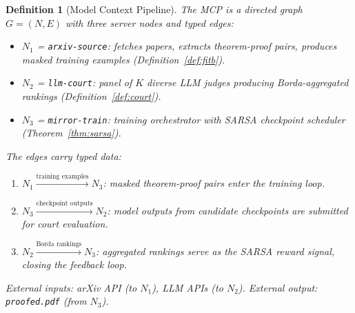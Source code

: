 \documentclass[11pt,a4paper]{article}
\newtheorem{definition}[theorem]{Definition}
\begin{document}
\begin{definition}[Model Context Pipeline]\label{def:mcp}
The MCP is a directed graph $G = (N, E)$ with three server
nodes and typed edges:
\begin{itemize}[nosep]
\item $N_1$ = \texttt{arxiv-source}: fetches papers,
  extracts theorem-proof pairs, produces masked training
  examples (Definition~\ref{def:fitb}).
\item $N_2$ = \texttt{llm-court}: panel of $K$ diverse LLM
  judges producing Borda-aggregated rankings
  (Definition~\ref{def:court}).
\item $N_3$ = \texttt{mirror-train}: training orchestrator
  with SARSA checkpoint scheduler
  (Theorem~\ref{thm:sarsa}).
\end{itemize}
The edges carry typed data:
\begin{enumerate}[label=(E\arabic*),nosep]
\item $N_1 \xrightarrow{\text{training examples}} N_3$:
  masked theorem-proof pairs enter the training loop.
\item $N_3 \xrightarrow{\text{checkpoint outputs}} N_2$:
  model outputs from candidate checkpoints are submitted
  for court evaluation.
\item $N_2 \xrightarrow{\text{Borda rankings}} N_3$:
  aggregated rankings serve as the SARSA reward signal,
  closing the feedback loop.
\end{enumerate}
External inputs: arXiv API (to $N_1$), LLM APIs (to $N_2$).
External output: \texttt{proofed.pdf} (from $N_3$).
\end{definition}
\end{document}
